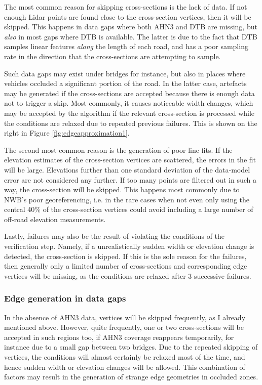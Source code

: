 The most common reason for skipping cross-sections is the lack of data. If not enough Lidar points are found close to the cross-section vertices, then it will be skipped. This happens in data gaps where both AHN3 and DTB are missing, but \textit{also} in most gaps where DTB is available. The latter is due to the fact that DTB samples linear features \textit{along} the length of each road, and has a poor sampling rate in the direction that the cross-sections are attempting to sample.

Such data gaps may exist under bridges for instance, but also in places where vehicles occluded a significant portion of the road. In the latter case, artefacts may be generated if the cross-sections are accepted because there is enough data not to trigger a skip. Most commonly, it causes noticeable width changes, which may be accepted by the algorithm if the relevant cross-section is processed while the conditions are relaxed due to repeated previous failures. This is shown on the right in Figure \ref{fig:edgeapproximation1}.

The second most common reason is the generation of poor line fits. If the elevation estimates of the cross-section vertices are scattered, the errors in the fit will be large. Elevations further than one standard deviation of the data-model error are not considered any further. If too many points are filtered out in such a way, the cross-section will be skipped. This happens most commonly due to NWB's poor georeferencing, i.e. in the rare cases when not even only using the central 40\% of the cross-section vertices could avoid including a large number of off-road elevation measurements.

Lastly, failures may also be the result of violating the conditions of the verification step. Namely, if a unrealistically sudden width or elevation change is detected, the cross-section is skipped. If this is the sole reason for the failures, then generally only a limited number of cross-sections and corresponding edge vertices will be missing, as the conditions are relaxed after 3 successive failures.

\subsubsection{Edge generation in data gaps}

In the absence of AHN3 data, vertices will be skipped frequently, as I already mentioned above. However, quite frequently, one or two cross-sections will be accepted in such regions too, if AHN3 coverage reappears temporarily, for instance due to a small gap between two bridges. Due to the repeated skipping of vertices, the conditions will almost certainly be relaxed most of the time, and hence sudden width or elevation changes will be allowed. This combination of factors may result in the generation of strange edge geometries in occluded zones.

